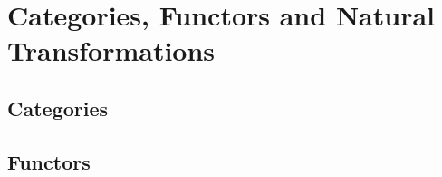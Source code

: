\chapter{Categories, Functors and Natural Transformations}





\section{Categories}
\addtocounter{subsection}{11}









\section{Functors}
\addtocounter{subsection}{19}










